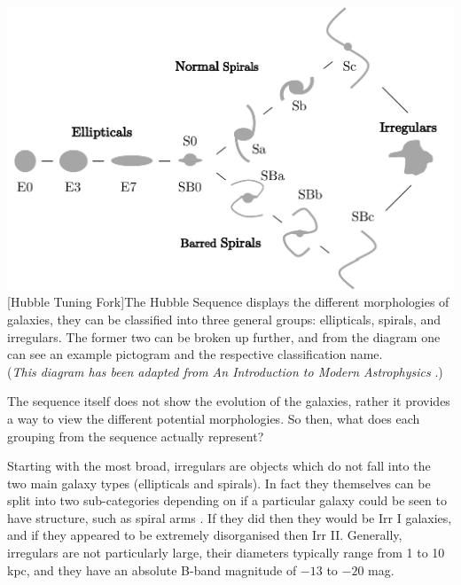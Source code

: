 \documentclass[12pt, twocolumn]{revtex4}    %
\begin{document}
\begin{center}
\includegraphics[width=1.0\linewidth]{introduction/hubble_tuning_fork}
[Hubble Tuning Fork]{The Hubble Sequence displays the different morphologies of galaxies, they can be classified into three general groups: ellipticals, spirals, and irregulars. The former two can be broken up further, and from the diagram one can see an example pictogram and the respective classification name. \\ (\textit{This diagram has been adapted from An Introduction to Modern Astrophysics} \cite{carroll_astro}.)}
\label{fig:hubble_tuning_fork}
\end{center}

The sequence itself does not show the evolution of the galaxies, rather it provides a way to view the different potential morphologies. So then, what does each grouping from the sequence actually represent? 

Starting with the most broad, irregulars are objects which do not fall into the two main galaxy types (ellipticals and spirals). In fact they themselves can be split into two sub-categories depending on if a particular galaxy could be seen to have structure, such as spiral arms \cite{carroll_astro}. If they did then they would be Irr I galaxies, and if they appeared to be extremely disorganised then Irr II. Generally, irregulars are not particularly large, their diameters typically range from 1 to 10 kpc, and they have an absolute B-band magnitude of $-13$ to $-20$ mag.

\end{document}

